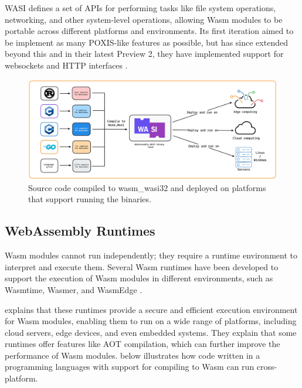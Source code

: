 \documentclass[
  table]{report}
\begin{document}
\ac{WASI} defines a set of APIs for performing tasks like file system
operations, networking, and other system-level operations, allowing
\ac{Wasm} modules to be portable across different platforms and
environments. Its first iteration aimed to be implement as many
POXIS-like features as possible, but has since extended beyond this and
in their latest Preview 2, they have implemented support for websockets
and HTTP interfaces \citep{WASIPreview2README}.

\begin{figure}[H]
\centering
  \includegraphics{assets/3-wasi-figure.png}
  \caption{Source code compiled to wasm\_wasi32 and deployed on platforms that support running the binaries.}
  \label{fig:wasm-wasi}
\end{figure}

\subsection{WebAssembly Runtimes}
\label{sect:wasm_runtimes}

\ac{Wasm} modules cannot run independently; they require a runtime
environment to interpret and execute them. Several \ac{Wasm} runtimes
have been developed to support the execution of \ac{Wasm} modules in
different environments, such as Wasmtime, Wasmer, and WasmEdge
\citep{zhang2024}.

\citet{zhang2024} explains that these runtimes provide a secure and
efficient execution environment for \ac{Wasm} modules, enabling them to
run on a wide range of platforms, including cloud servers, edge devices,
and even embedded systems. They explain that some runtimes offer
features like \ac{AOT} compilation, which can further improve the
performance of \ac{Wasm} modules.  below
illustrates how code written in a programming languages with support for
compiling to \ac{Wasm} can run cross-platform.
\end{document}
